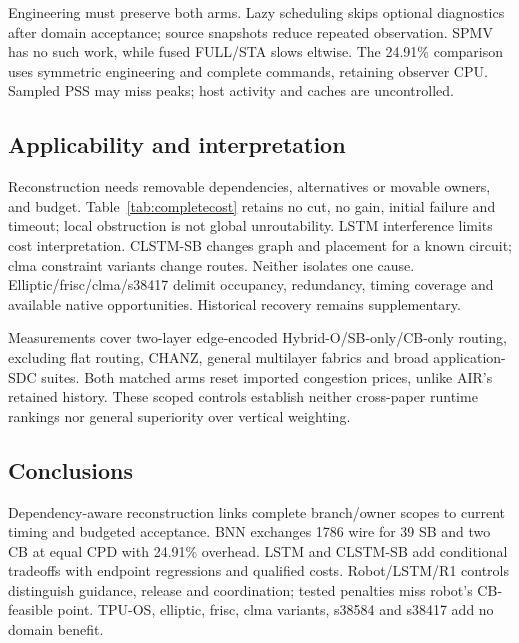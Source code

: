 \documentclass[conference,10pt]{IEEEtran}
\begin{document}
Engineering must preserve both arms. Lazy scheduling skips optional diagnostics after domain acceptance; source snapshots reduce repeated observation. SPMV has no such work, while fused FULL/STA slows eltwise. The 24.91\% comparison uses symmetric engineering and complete commands, retaining observer CPU. Sampled PSS may miss peaks; host activity and caches are uncontrolled.

\subsection{Applicability and interpretation}
Reconstruction needs removable dependencies, alternatives or movable owners, and budget. Table~\ref{tab:completecost} retains no cut, no gain, initial failure and timeout; local obstruction is not global unroutability. LSTM interference limits cost interpretation. CLSTM-SB changes graph and placement for a known circuit; clma constraint variants change routes. Neither isolates one cause. Elliptic/frisc/clma/s38417 delimit occupancy, redundancy, timing coverage and available native opportunities. Historical recovery remains supplementary.

Measurements cover two-layer edge-encoded Hybrid-O/SB-only/CB-only routing, excluding flat routing, CHANZ, general multilayer fabrics and broad application-SDC suites. Both matched arms reset imported congestion prices, unlike AIR's retained history. These scoped controls establish neither cross-paper runtime rankings nor general superiority over vertical weighting.

\subsection{Conclusions}
Dependency-aware reconstruction links complete branch/owner scopes to current timing and budgeted acceptance. BNN exchanges 1786 wire for 39 SB and two CB at equal CPD with 24.91\% overhead. LSTM and CLSTM-SB add conditional tradeoffs with endpoint regressions and qualified costs. Robot/LSTM/R1 controls distinguish guidance, release and coordination; tested penalties miss robot's CB-feasible point. TPU-OS, elliptic, frisc, clma variants, s38584 and s38417 add no domain benefit.


\end{document}
